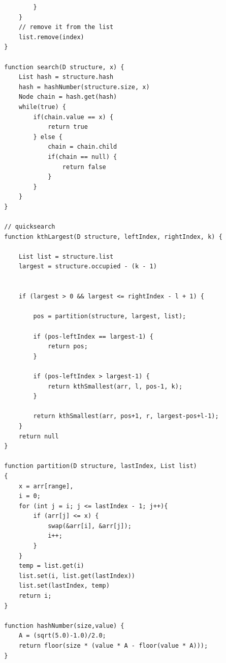 \documentclass[11pt]{article}
\begin{document}
\begin{verbatim}
                }
            }
            // remove it from the list
            list.remove(index) 
        }

        function search(D structure, x) {
            List hash = structure.hash
            hash = hashNumber(structure.size, x)
            Node chain = hash.get(hash)
            while(true) {
                if(chain.value == x) {
                    return true
                } else {
                    chain = chain.child
                    if(chain == null) {
                        return false
                    }
                }
            }
        }

        // quicksearch
        function kthLargest(D structure, leftIndex, rightIndex, k) {
            
            List list = structure.list
            largest = structure.occupied - (k - 1)


            if (largest > 0 && largest <= rightIndex - l + 1) {
                
                pos = partition(structure, largest, list);
                
                if (pos-leftIndex == largest-1) {
                    return pos;
                }
			    
                if (pos-leftIndex > largest-1) {
                    return kthSmallest(arr, l, pos-1, k);
                }
			        
                return kthSmallest(arr, pos+1, r, largest-pos+l-1);
	        }
            return null
        }

        function partition(D structure, lastIndex, List list)
        {
            x = arr[range],
            i = 0;
	        for (int j = i; j <= lastIndex - 1; j++){
		        if (arr[j] <= x) {
			        swap(&arr[i], &arr[j]);
			        i++;
		        }
	        }
            temp = list.get(i)
            list.set(i, list.get(lastIndex))
            list.set(lastIndex, temp)
	        return i;
        }

        function hashNumber(size,value) {
            A = (sqrt(5.0)-1.0)/2.0;
            return floor(size * (value * A - floor(value * A)));
        }   

        \end{verbatim}
       
    
\end{document}
